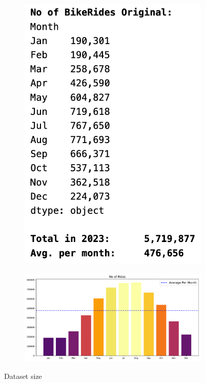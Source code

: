 \documentclass[12pt]{article}
\begin{document}
	\begin{figure}[h]
	\centering
	\begin{subfigure}{.3\textwidth}
	\hspace{-0.4 in}
		\includegraphics[scale=0.5]{no_of_rides_orig.png}
	\end{subfigure}
	\begin{subfigure}{.6\textwidth}
	\hspace{-0.8 in}
		\includegraphics[scale=0.47]{no_of_rides.pdf}
	\end{subfigure}
	\caption{Dataset size}
	\label{fig3}
	\end{figure}
\end{document}
